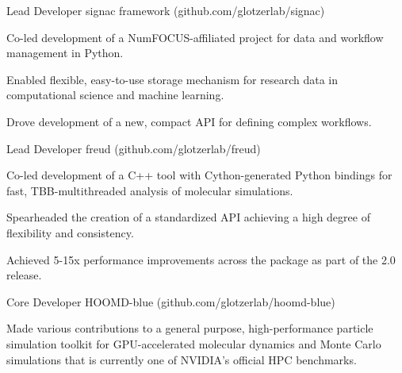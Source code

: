 \begin{cventries}
  \cventry
    {Lead Developer} %
    {signac framework ({\tiny github.com/glotzerlab/signac})} %
    {} %
    {} %
    {
      \begin{cvitems} %
        \item Co-led development of a NumFOCUS-affiliated project for data and workflow management in Python.
        \item Enabled flexible, easy-to-use storage mechanism for research data in computational science and machine learning.
        \item Drove development of a new, compact API for defining complex workflows.
      \end{cvitems}
    }
  \cventry
    {Lead Developer} %
    {freud ({\tiny github.com/glotzerlab/freud})} %
    {} %
    {} %
    {
      \begin{cvitems} %
        \item Co-led development of a C++ tool with Cython-generated Python bindings for fast, TBB-multithreaded analysis of molecular simulations.
        \item Spearheaded the creation of a standardized API achieving a high degree of flexibility and consistency.
        \item Achieved 5-15x performance improvements across the package as part of the 2.0 release.
      \end{cvitems}
    }
  \cventry
    {Core Developer} %
    {HOOMD-blue ({\tiny github.com/glotzerlab/hoomd-blue})} %
    {} %
    {} %
    {
      \begin{cvitems} %
        \item Made various contributions to a general purpose, high-performance particle simulation toolkit for GPU-accelerated molecular dynamics and Monte Carlo simulations that is currently one of NVIDIA's official HPC benchmarks.

\end{cvitems}}
\end{cventries}
